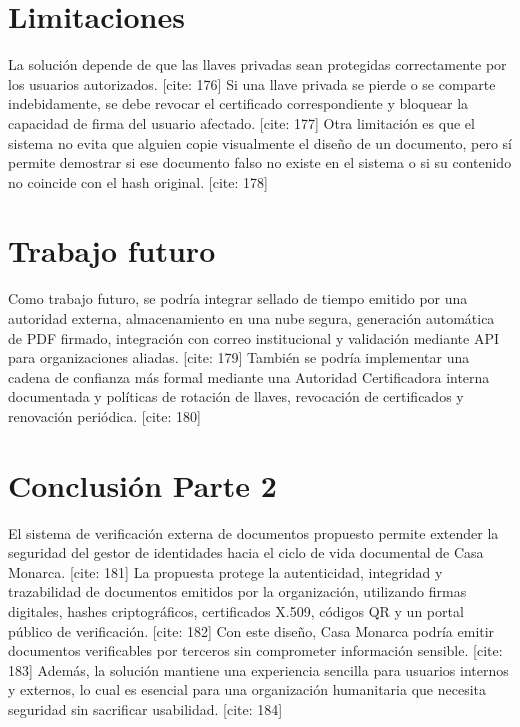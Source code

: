 \documentclass[10pt]{article} [cite: 1]
\begin{document}
\section{Limitaciones}

La solución depende de que las llaves privadas sean protegidas correctamente por los usuarios autorizados. [cite: 176] Si una llave privada se pierde o se comparte indebidamente, se debe revocar el certificado correspondiente y bloquear la capacidad de firma del usuario afectado. [cite: 177] Otra limitación es que el sistema no evita que alguien copie visualmente el diseño de un documento, pero sí permite demostrar si ese documento falso no existe en el sistema o si su contenido no coincide con el hash original. [cite: 178]

\section{Trabajo futuro}

Como trabajo futuro, se podría integrar sellado de tiempo emitido por una autoridad externa, almacenamiento en una nube segura, generación automática de PDF firmado, integración con correo institucional y validación mediante API para organizaciones aliadas. [cite: 179] También se podría implementar una cadena de confianza más formal mediante una Autoridad Certificadora interna documentada y políticas de rotación de llaves, revocación de certificados y renovación periódica. [cite: 180]

\section{Conclusión Parte 2}

El sistema de verificación externa de documentos propuesto permite extender la seguridad del gestor de identidades hacia el ciclo de vida documental de Casa Monarca. [cite: 181] La propuesta protege la autenticidad, integridad y trazabilidad de documentos emitidos por la organización, utilizando firmas digitales, hashes criptográficos, certificados X.509, códigos QR y un portal público de verificación. [cite: 182] Con este diseño, Casa Monarca podría emitir documentos verificables por terceros sin comprometer información sensible. [cite: 183] Además, la solución mantiene una experiencia sencilla para usuarios internos y externos, lo cual es esencial para una organización humanitaria que necesita seguridad sin sacrificar usabilidad. [cite: 184]
\end{document}
